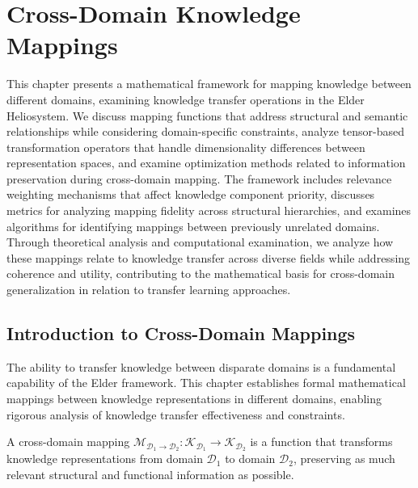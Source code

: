 \chapter{Cross-Domain Knowledge Mappings}

\begin{tcolorbox}[colback=PureBlue!5!white,colframe=PureBlue!75!black,title=Chapter Summary]
This chapter presents a mathematical framework for mapping knowledge between different domains, examining knowledge transfer operations in the Elder Heliosystem. We discuss mapping functions that address structural and semantic relationships while considering domain-specific constraints, analyze tensor-based transformation operators that handle dimensionality differences between representation spaces, and examine optimization methods related to information preservation during cross-domain mapping. The framework includes relevance weighting mechanisms that affect knowledge component priority, discusses metrics for analyzing mapping fidelity across structural hierarchies, and examines algorithms for identifying mappings between previously unrelated domains. Through theoretical analysis and computational examination, we analyze how these mappings relate to knowledge transfer across diverse fields while addressing coherence and utility, contributing to the mathematical basis for cross-domain generalization in relation to transfer learning approaches.
\end{tcolorbox}

\section{Introduction to Cross-Domain Mappings}

The ability to transfer knowledge between disparate domains is a fundamental capability of the Elder framework. This chapter establishes formal mathematical mappings between knowledge representations in different domains, enabling rigorous analysis of knowledge transfer effectiveness and constraints.

\begin{definition}
A cross-domain mapping $\mathcal{M}_{\mathcal{D}_1 \rightarrow \mathcal{D}_2}: \mathcal{K}_{\mathcal{D}_1} \rightarrow \mathcal{K}_{\mathcal{D}_2}$ is a function that transforms knowledge representations from domain $\mathcal{D}_1$ to domain $\mathcal{D}_2$, preserving as much relevant structural and functional information as possible.
\end{definition}

